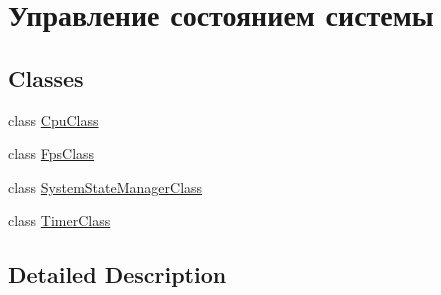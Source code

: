 \hypertarget{group___system_state_managment}{}\section{Управление состоянием системы}
\label{group___system_state_managment}
\subsection*{Classes}
\begin{DoxyCompactItemize}
\item 
class \hyperlink{class_cpu_class}{Cpu\+Class}
\item 
class \hyperlink{class_fps_class}{Fps\+Class}
\item 
class \hyperlink{class_system_state_manager_class}{System\+State\+Manager\+Class}
\item 
class \hyperlink{class_timer_class}{Timer\+Class}
\end{DoxyCompactItemize}


\subsection{Detailed Description}
